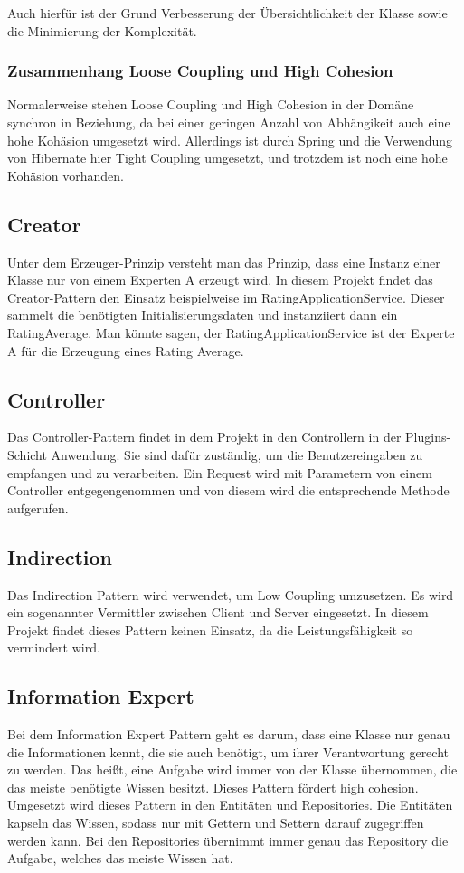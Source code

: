 		Auch hierfür ist der Grund Verbesserung der Übersichtlichkeit der Klasse sowie die Minimierung der Komplexität.
		
		\subsubsection{Zusammenhang Loose Coupling und High Cohesion}
		Normalerweise stehen Loose Coupling und High Cohesion in der Domäne synchron in Beziehung, da bei einer geringen Anzahl von Abhängikeit auch eine hohe Kohäsion umgesetzt wird. Allerdings ist durch Spring und die Verwendung von Hibernate hier Tight Coupling umgesetzt, und trotzdem ist noch eine hohe Kohäsion vorhanden.

    \subsection{Creator}
    Unter dem Erzeuger-Prinzip versteht man das Prinzip, dass eine Instanz einer Klasse nur von einem Experten A erzeugt wird. In diesem Projekt findet das Creator-Pattern den Einsatz beispielweise im RatingApplicationService. Dieser sammelt die benötigten Initialisierungsdaten und instanziiert dann ein RatingAverage. Man könnte sagen, der RatingApplicationService ist der Experte A für die Erzeugung eines Rating Average.
    
    \subsection{Controller}
    Das Controller-Pattern findet in dem Projekt in den Controllern in der Plugins-Schicht Anwendung. Sie sind dafür zuständig, um die Benutzereingaben zu empfangen und zu verarbeiten. Ein Request wird mit Parametern von einem Controller entgegengenommen und von diesem wird die entsprechende Methode aufgerufen.
    
    \subsection{Indirection}
    Das Indirection Pattern wird verwendet, um Low Coupling umzusetzen. Es wird ein sogenannter Vermittler zwischen Client und Server eingesetzt. In diesem Projekt findet dieses Pattern keinen Einsatz, da die Leistungsfähigkeit so vermindert wird.
    
    \subsection{Information Expert}
    Bei dem Information Expert Pattern geht es darum, dass eine Klasse nur genau die Informationen kennt, die sie auch benötigt, um ihrer Verantwortung gerecht zu werden. Das heißt, eine Aufgabe wird immer von der Klasse übernommen, die das meiste benötigte Wissen besitzt. Dieses Pattern fördert high cohesion. Umgesetzt wird dieses Pattern in den Entitäten und Repositories. Die Entitäten kapseln das Wissen, sodass nur mit Gettern und Settern darauf zugegriffen werden kann. Bei den Repositories übernimmt immer genau das Repository die Aufgabe, welches das meiste Wissen hat.
    
